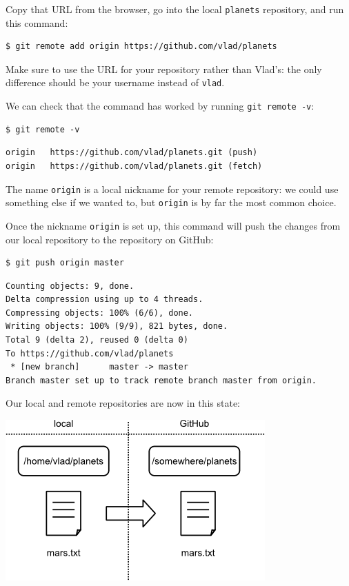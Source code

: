\documentclass{book}
\begin{document}
Copy that URL from the browser, go into the local \texttt{planets}
repository, and run this command:

\begin{verbatim}
$ git remote add origin https://github.com/vlad/planets
\end{verbatim}

Make sure to use the URL for your repository rather than Vlad's: the
only difference should be your username instead of \texttt{vlad}.

We can check that the command has worked by running
\texttt{git remote -v}:

\begin{verbatim}
$ git remote -v
\end{verbatim}

\begin{verbatim}
origin   https://github.com/vlad/planets.git (push)
origin   https://github.com/vlad/planets.git (fetch)
\end{verbatim}

The name \texttt{origin} is a local nickname for your remote repository:
we could use something else if we wanted to, but \texttt{origin} is by
far the most common choice.

Once the nickname \texttt{origin} is set up, this command will push the
changes from our local repository to the repository on GitHub:

\begin{verbatim}
$ git push origin master
\end{verbatim}

\begin{verbatim}
Counting objects: 9, done.
Delta compression using up to 4 threads.
Compressing objects: 100% (6/6), done.
Writing objects: 100% (9/9), 821 bytes, done.
Total 9 (delta 2), reused 0 (delta 0)
To https://github.com/vlad/planets
 * [new branch]      master -> master
Branch master set up to track remote branch master from origin.
\end{verbatim}

Our local and remote repositories are now in this state:

\includegraphics{novice/git/img/github-repo-after-first-push.png}
\end{document}
